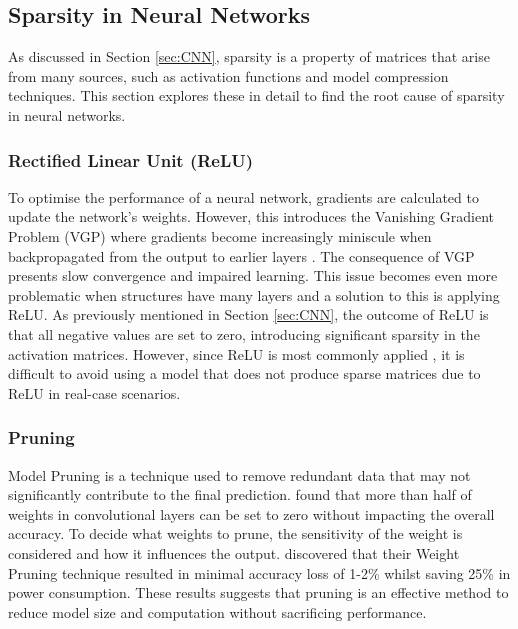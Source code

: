 \documentclass[12pt, a4paper, ukenglish]{article}
\begin{document}
    \subsection{Sparsity in Neural Networks} \label{sec: sparsity in nn}
    As discussed in Section \ref{sec:CNN}, sparsity is a property of matrices that arise from many sources, such as activation functions and model compression techniques. This section explores these in detail to find the root cause of sparsity in neural networks. 

        \subsubsection{Rectified Linear Unit (ReLU)} \label{sec:relu}
        To optimise the performance of a neural network, gradients are calculated to update the network's weights. However, this introduces the Vanishing Gradient Problem (VGP) where gradients become increasingly miniscule when backpropagated from the output to earlier layers \cite{tan_vanishing_2019}. The consequence of VGP presents slow convergence and impaired learning. This issue becomes even more problematic when structures have many layers and a solution to this is applying ReLU. As previously mentioned in Section \ref{sec:CNN}, the outcome of ReLU is that all negative values are set to zero, introducing significant sparsity in the activation matrices. However, since ReLU is most commonly applied \cite{sun_sense_2023}, it is difficult to avoid using a model that does not produce sparse matrices due to ReLU in real-case scenarios.


    
        \subsubsection{Pruning}\label{sec:pruning}

        Model Pruning is a technique used to remove redundant data that may not significantly contribute to the final prediction. \textcite{kim_fpga_2021} found that more than half of weights in convolutional layers can be set to zero without impacting the overall accuracy. To decide what weights to prune, the sensitivity of the weight is considered and how it influences the output. \textcite{gorvadiya_energy_2025} discovered that their Weight Pruning technique resulted in minimal accuracy loss of 1-2\% whilst saving 25\% in power consumption. These results suggests that pruning is an effective method to reduce model size and computation without sacrificing performance.
\end{document}
